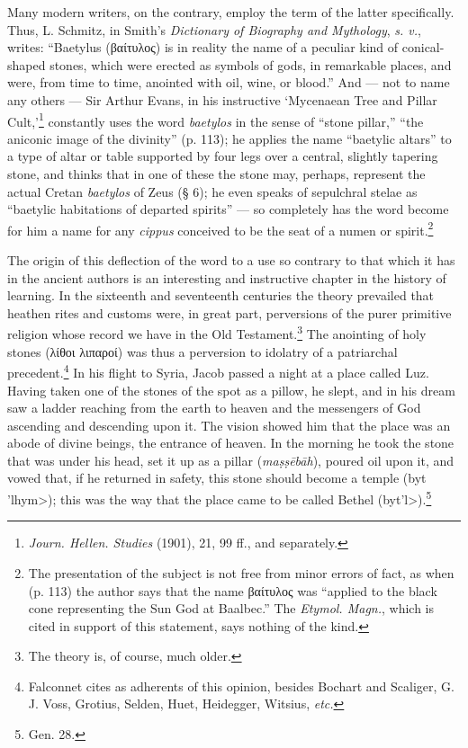 \documentclass[a4paper, 12pt, oneside, polutonikogreek, english]{article}
\begin{document}
Many modern writers, on the contrary, employ the term of the latter specifically. Thus, L. Schmitz, in Smith's \emph{Dictionary of Biography and Mythology}, \emph{s. v.}, writes: ``Baetylus (βαίτυλος) is in reality the name of a peculiar kind of conical-shaped stones, which were erected as symbols of gods, in remarkable places, and were, from time to time, anointed with oil, wine, or blood.'' And --- not to name any others --- Sir Arthur Evans, in his instructive `Mycenaean Tree and Pillar Cult,'\footnote{\emph{Journ. Hellen. Studies} (1901), 21, 99 ff., and separately.} constantly uses the word \emph{baetylos} in the sense of ``stone pillar,'' ``the aniconic image of the divinity'' (p. 113); he applies the name ``baetylic altars'' to a type of altar or table supported by four legs over a central, slightly tapering stone, and thinks that in one of these the stone may, perhaps, represent the actual Cretan \emph{baetylos} of Zeus (§ 6); he even speaks of sepulchral stelae as ``baetylic habitations of departed spirits'' --- so completely has the word become for him a name for any \emph{cippus} conceived to be the seat of a numen or spirit.\footnote{The presentation of the subject is not free from minor errors of fact, as when (p. 113) the author says that the name βαίτυλος was ``applied to the black cone representing the Sun God at Baalbec.'' The \emph{Etymol. Magn.}, which is cited in support of this statement, says nothing of the kind.}

The origin of this deflection of the word to a use so contrary to that which it has in the ancient authors is an interesting and instructive chapter in the history of learning. In the sixteenth and seventeenth centuries the theory prevailed that heathen rites and customs were, in great part, perversions of the purer primitive religion whose record we have in the Old Testament.\footnote{The theory is, of course, much older.} The anointing of holy stones (λίθοι λιπαροί) was thus a perversion to idolatry of a patriarchal precedent.\footnote{Falconnet cites as adherents of this opinion, besides Bochart and Scaliger, G. J. Voss, Grotius, Selden, Huet, Heidegger, Witsius, \emph{etc.}} In his flight to Syria, Jacob passed a night at a place called Luz. Having taken one of the stones of the spot as a pillow, he slept, and in his dream saw a ladder reaching from the earth to heaven and the messengers of God ascending and descending upon it. The vision showed him that the place was an abode of divine beings, the entrance of heaven. In the morning he took the stone that was under his head, set it up as a pillar (\emph{maṣṣēbāh}), poured oil upon it, and vowed that, if he returned in safety, this stone should become a temple (\<byt 'lhym>); this was the way that the place came to be called Bethel (\<byt'l>).\footnote{Gen. 28.}
\end{document}
